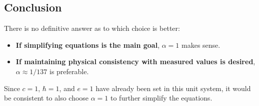 \documentclass{article}
\begin{document}
	\subsection*{Conclusion}
	
	There is no definitive answer as to which choice is better:
	
	\begin{itemize}
		\item \textbf{If simplifying equations is the main goal}, \( \alpha = 1 \) makes sense.
		\item \textbf{If maintaining physical consistency with measured values is desired}, \( \alpha \approx 1/137 \) is preferable.
	\end{itemize}
	
	Since \( c = 1 \), \( \hbar = 1 \), and \( e = 1 \) have already been set in this unit system, it would be consistent to also choose \( \alpha = 1 \) to further simplify the equations.
	
\end{document}
